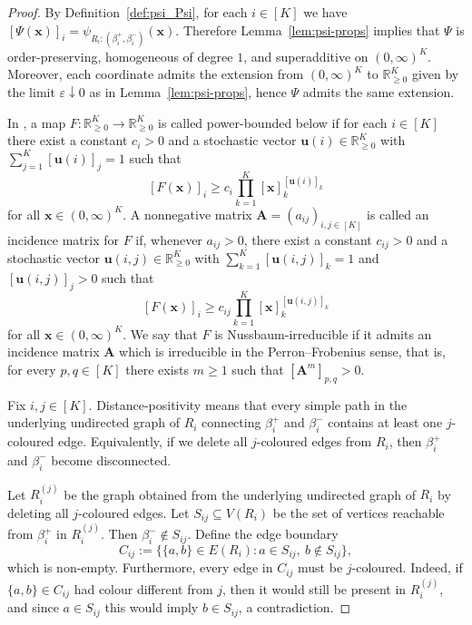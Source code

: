 \documentclass{article}
\theoremstyle{plain}
\theoremstyle{definition}
\begin{document}
\begin{proof}
By Definition~\ref{def:psi_Psi}, for each $i\in[K]$ we have
$
[\Psi(\mathbf x)]_i=\psi_{R_i:(\beta_i^+,\beta_i^-)}(\mathbf x).
$
Therefore Lemma~\ref{lem:psi-props} implies that $\Psi$ is order-preserving, homogeneous of degree $1$, and superadditive on $(0,\infty)^K$.
Moreover, each coordinate admits the extension from $(0,\infty)^K$ to $\mathbb R_{\ge 0}^K$ given by the limit $\varepsilon\downarrow 0$ as in Lemma~\ref{lem:psi-props}, hence $\Psi$ admits the same extension.

In \cite{nussbaum1986convexity}, a map $F:\mathbb R_{\ge 0}^K\to\mathbb R_{\ge 0}^K$ is called power-bounded below if for each $i\in[K]$ there exist a constant $c_i>0$ and a stochastic vector $\mathbf u(i)\in\mathbb R_{\ge 0}^K$ with $\sum_{j=1}^K [\mathbf u(i)]_j=1$ such that
\[
[F(\mathbf x)]_i
\ge
c_i \prod_{k=1}^K [\mathbf x]_k^{[\mathbf u(i)]_k}
\]
for all $\mathbf x\in(0,\infty)^K$.
A nonnegative matrix $\mathbf A=(a_{ij})_{i,j\in[K]}$ is called an incidence matrix for $F$ if, whenever $a_{ij}>0$, there exist a constant $c_{ij}>0$ and a stochastic vector $\mathbf u(i,j)\in\mathbb R_{\ge 0}^K$ with $\sum_{k=1}^K [\mathbf u(i,j)]_k=1$ and $[\mathbf u(i,j)]_j>0$ such that
\[
[F(\mathbf x)]_i
\ge
c_{ij} \prod_{k=1}^K [\mathbf x]_k^{[\mathbf u(i,j)]_k}
\]
for all $\mathbf x\in(0,\infty)^K$.
We say that $F$ is Nussbaum-irreducible if it admits an incidence matrix $\mathbf A$ which is irreducible in the Perron--Frobenius sense, that is, for every $p,q\in[K]$ there exists $m\ge 1$ such that $[\mathbf A^m]_{p,q}>0$.

Fix $i,j\in[K]$.
Distance-positivity means that every simple path in the underlying undirected graph of $R_i$ connecting $\beta_i^+$ and $\beta_i^-$ contains at least one $j$-coloured edge.
Equivalently, if we delete all $j$-coloured edges from $R_i$, then $\beta_i^+$ and $\beta_i^-$ become disconnected.

Let $R_i^{(j)}$ be the graph obtained from the underlying undirected graph of $R_i$ by deleting all $j$-coloured edges.
Let $S_{ij}\subseteq V(R_i)$ be the set of vertices reachable from $\beta_i^+$ in $R_i^{(j)}$.
Then $\beta_i^-\notin S_{ij}$.
Define the edge boundary
\[
C_{ij}:=\big\{\{a,b\}\in E(R_i): a\in S_{ij},\ b\notin S_{ij}\big\},
\]
which is non-empty.
Furthermore, every edge in $C_{ij}$ must be $j$-coloured.
Indeed, if $\{a,b\}\in C_{ij}$ had colour different from $j$, then it would still be present in $R_i^{(j)}$, and since $a\in S_{ij}$ this would imply $b\in S_{ij}$, a contradiction.


\end{proof}
\end{document}
